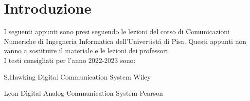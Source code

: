 \section{Introduzione}
I seguenti appunti sono presi seguendo le lezioni del corso di Comunicazioni Numeriche 
di Ingegneria Informatica dell'Univertistá di Pisa. Questi appunti non 
vanno a sostituire il materiale e le lezioni dei professori.\\
I testi consigliati per l'anno 2022-2023 sono:

S.Hawking Digital Communication System Wiley


Leon Digital Analog Communication System Pearson

